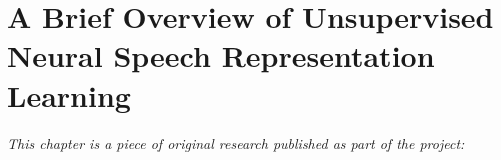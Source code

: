 
\chapter[a brief overview of unsupervised neural speech representation learning]{A Brief Overview of Unsupervised Neural Speech Representation Learning}
\label{chp:paper-brief}

\textit{This chapter is a piece of original research published as part of the project:} \newline
\begin{center}
    \begin{enumerate}[leftmargin=8mm,rightmargin=8mm,topsep=0mm,label={[\Alph*]}]
        \setcounter{enumi}{2}
        \item {} \co \label{enumerate: paper-brief}
        \end{enumerate}
\end{center}

